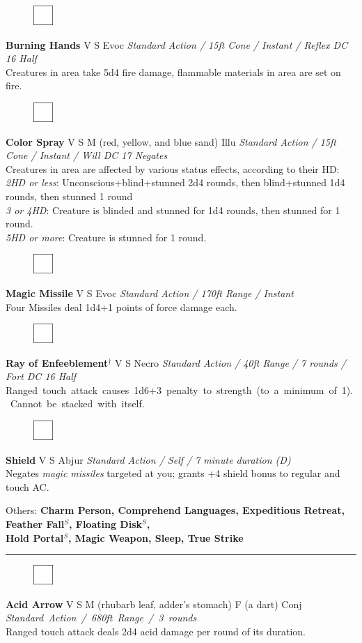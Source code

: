 \documentclass[letterpaper]{article}
\newcommand{\e}[1]{\emph{#1}}
\newcommand{\B}[1]{\textbf{#1}}
\newcommand{\s}[0]{$^S$}
\newcommand{\D}[0]{$^\dag$}
\newcommand{\spell}[7]{
\begin{figure}
\vspace{-13pt}
\ifstrequal{#2}{Full}{  \includegraphics[width=2em]{Checkbox-Full}}{
\ifstrequal{#2}{Scroll}{\includegraphics[width=2em]{Checkbox-S}}{
                        \includegraphics[width=2em]{Checkbox}}}
\ifstrequal{#7}{}{\vspace{-1em}}{\vspace{#7}}
\end{figure}
 \B{#1} #3 {
    \ifstrequal{#4}{Conj}{\color{Plum}Conj}{%
    \ifstrequal{#4}{Divin}{\color{YellowOrange}Divin}{%
    \ifstrequal{#4}{Ench}{\color{VioletRed}Ench}{%
    \ifstrequal{#4}{Trans}{\color{LimeGreen}Trans}{%
    \ifstrequal{#4}{Evoc}{\color{RedOrange}Evoc}{%
    \ifstrequal{#4}{Illu}{\color{ProcessBlue}Illu}{%
    \ifstrequal{#4}{Abjur}{\color{CadetBlue}Abjur}{%
    \ifstrequal{#4}{Necro}{\color{Red}Necro}{%
}}}}}}}}}
{\footnotesize \e{#5}} \\
#6
}
\begin{document}
\spell{Burning Hands}{}{V S}{Evoc}{Standard Action / 15ft Cone / Instant / Reflex DC 16 Half}{%
Creatures in area take 5d4 fire damage, flammable materials in area are set on fire.}{}\\[-1em] %

\spell{Color Spray}{}{V S M (red, yellow, and blue sand)}{Illu}{Standard Action / 15ft Cone / Instant / Will DC 17 Negates}{%
Creatures in area are affected by various status effects, according to their HD:\\
\e{2HD or less}: Unconscious+blind+stunned 2d4 rounds, then blind+stunned 1d4 rounds, then stunned 1 round \\
\e{3 or 4HD}: Creature is blinded and stunned for 1d4 rounds, then stunned for 1 round.\\
\e{5HD or more}: Creature is stunned for 1 round.}{1em}

\spell{Magic Missile}{}{V S}{Evoc}{Standard Action / 170ft Range / Instant}{%
Four Missiles deal 1d4+1 points of force damage each.}{} \\[-1em] %

\spell{Ray of Enfeeblement\D}{}{V S}{Necro}{Standard Action / 40ft Range / 7 rounds / Fort DC 16 Half}{%
\mbox{Ranged touch attack causes 1d6+3 penalty to strength (to a minimum of 1).  Cannot be stacked with itself.}}{} \\[-1em] %

\spell{Shield}{}{V S}{Abjur}{Standard Action / Self / 7 minute duration (D)}{%
Negates \e{magic missiles} targeted at you; grants +4 shield bonus to regular and touch AC.}{}\\[-1em] %

\begin{adjustwidth}{3em}{0em}
Others: \B{Charm Person, Comprehend Languages, Expeditious Retreat, Feather Fall\s , Floating Disk\s ,\\ Hold Portal\s , Magic Weapon, Sleep, True Strike} \\[-1em]
\end{adjustwidth}

\hrule\vspace{0.5em}

\spell{Acid Arrow}{}{V S M (rhubarb leaf, adder's stomach) F (a dart)}{Conj}{\mbox{Standard Action / 680ft Range / 3 rounds}}{%
Ranged touch attack deals 2d4 acid damage per round of its duration.}{}\\[-1em] %
\end{document}
